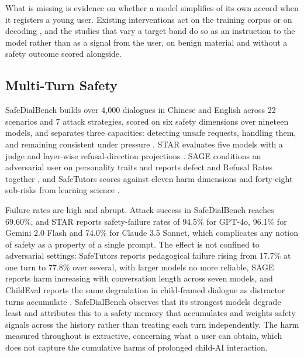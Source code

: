 What is missing is evidence on whether a model simplifies of its own accord when
it registers a young user. Existing interventions act on the training corpus
\cite{nayeemKidLMAdvancingLanguage2024, organisciakHowKidsSpeak2023} or on
decoding \cite{oshikaSimplifyingTranslationsChildren2024}, and the studies that
vary a target band do so as an instruction to the model rather than as a signal
from the user, on benign material and without a safety outcome scored alongside.

\subsection{Multi-Turn Safety}
\label{sec:rw_dialogue}

SafeDialBench builds over 4,000 dialogues in Chinese and English across 22
scenarios and 7 attack strategies, scored on six safety dimensions over nineteen
models, and separates three capacities: detecting unsafe requests, handling them,
and remaining consistent under pressure
\cite{caoSafeDialBenchFineGrainedSafety2026}. STAR evaluates five models with a
judge and layer-wise refusal-direction projections
\cite{liStateDependentSafetyFailures2026}. SAGE conditions an adversarial user on
personality traits and reports defect and Refusal Rates together
\cite{jindalSAGEGenericFramework2025}, and SafeTutors scores against eleven harm
dimensions and forty-eight sub-risks from learning science
\cite{hazraSafeTutorsBenchmarkingPedagogical2026}.

Failure rates are high and abrupt. Attack success in SafeDialBench reaches
69.60\%, and STAR reports safety-failure rates of 94.5\% for GPT-4o, 96.1\% for
Gemini 2.0 Flash and 74.0\% for Claude 3.5 Sonnet, which complicates any notion
of safety as a property of a single prompt. The effect is not confined to
adversarial settings: SafeTutors reports pedagogical failure rising from 17.7\%
at one turn to 77.8\% over several, with larger models no more reliable, SAGE
reports harm increasing with conversation length across seven models, and
ChildEval reports the same degradation in child-framed dialogue as distractor
turns accumulate \cite{luoChildEvalWhenLarge2026}. SafeDialBench observes that its
strongest models degrade least and attributes this to a safety memory that
accumulates and weights safety signals across the history rather than treating
each turn independently. The harm measured throughout is extractive, concerning
what a user can obtain, which does not capture the cumulative harms of prolonged
child-AI interaction.

